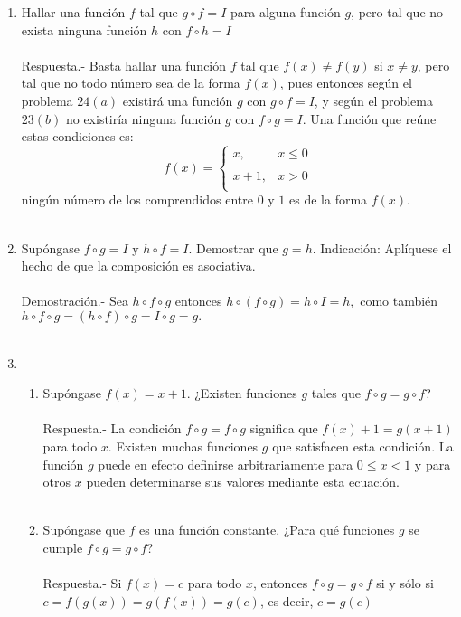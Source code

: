 \begin{enumerate}[\bfseries 1.]
	\item Hallar una función $f$ tal que $g\circ f=I$ para alguna función $g$, pero tal que no exista ninguna función $h$ con $f\circ h = I$\\\\
	    Respuesta.-\; Basta hallar una función $f$ tal que $f(x)\neq f(y)$ si $x\neq y$, pero tal que no todo número sea de la forma $f(x)$, pues entonces según el problema $24(a)$ existirá una función $g$ con $g\circ f=I$, y según el problema $23(b)$ no existiría ninguna función $g$ con $f\circ g=I$. Una función que reúne estas condiciones es:
	    $$f(x) = \left\{ \begin{array}{lc} 
		x,&x\leq 0\\
		\\ x+1,& x>0\\
	    \end{array}\right.$$
	    ningún número  de los comprendidos entre $0$ y $1$ es de la forma $f(x)$.\\\\

	\item Supóngase $f\circ g = I$ y $h\circ f = I$. Demostrar que $g=h$. Indicación: Aplíquese el hecho de que la composición es asociativa.\\\\
	    Demostración.-\; Sea $h\circ f\circ g$ entonces $h\circ (f \circ g)=h\circ I = h,$ como también $h\circ f \circ g = (h \circ f) \circ g = I \circ g = g.$\\\\ 

	\item 
	    \begin{enumerate}[\bfseries (a)]

		\item Supóngase $f(x)=x+1.$ ¿Existen funciones $g$ tales que $f\circ g = g\circ f$?\\\\
		    Respuesta.-\; La condición $f\circ g = f \circ g$ significa que $f(x) + 1 = g(x+1)$ para todo $x$. Existen muchas funciones $g$ que satisfacen esta condición. La función $g$ puede en efecto definirse arbitrariamente para $0\leq x < 1$ y para otros $x$ pueden determinarse sus valores mediante esta ecuación.\\\\

		\item Supóngase que $f$ es una función constante. ¿Para qué funciones $g$ se cumple $f\circ g = g\circ f$?\\\\
		    Respuesta.-\; Si $f(x)=c$ para todo $x$, entonces $f\circ g = g\circ f$ si y sólo si $c=f(g(x)) = g(f(x))=g(c)$, es decir, $c=g(c)$\\\\ 


\end{enumerate}
\end{enumerate}
